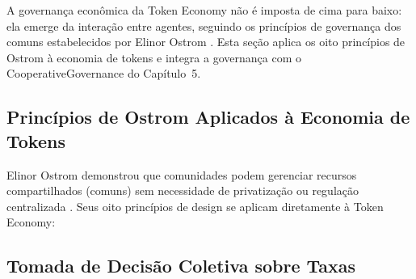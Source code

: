 A governança econômica da Token Economy não é imposta de cima
para baixo: ela emerge da interação entre agentes, seguindo os
princípios de governança dos comuns estabelecidos por Elinor
Ostrom \cite{ostrom1990governing}. Esta seção aplica os oito
princípios de Ostrom à economia de tokens e integra a governança
com o CooperativeGovernance do Capítulo~5.

\subsection{Princípios de Ostrom Aplicados à Economia de Tokens}

Elinor Ostrom demonstrou que comunidades podem gerenciar recursos
compartilhados (comuns) sem necessidade de privatização ou
regulação centralizada \cite{ostrom1990governing}. Seus oito
princípios de design se aplicam diretamente à Token Economy:

\begin{table}[htb]
\centering
    \small
\caption{Princípios de Ostrom aplicados à Token Economy}
\label{tab:ostrom-token}
\end{table}

\subsection{Tomada de Decisão Coletiva sobre Taxas}

